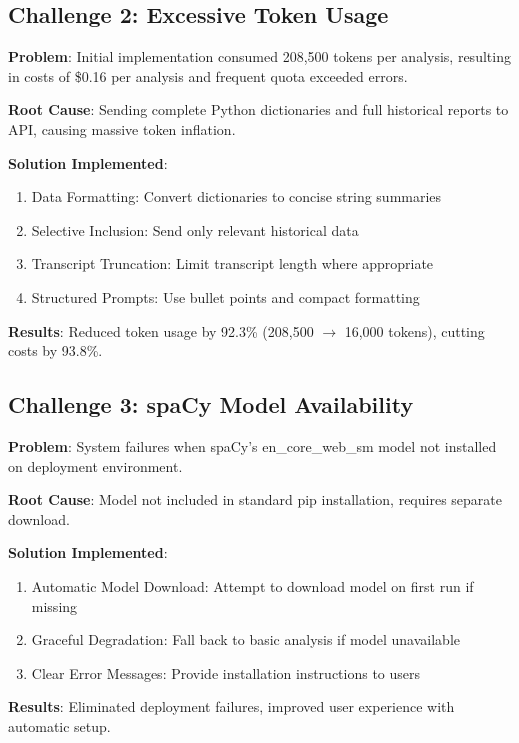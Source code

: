 \documentclass[conference]{IEEEtran}
\begin{document}
\subsection{Challenge 2: Excessive Token Usage}

\textbf{Problem}: Initial implementation consumed 208,500 tokens per analysis, resulting in costs of \$0.16 per analysis and frequent quota exceeded errors.

\textbf{Root Cause}: Sending complete Python dictionaries and full historical reports to API, causing massive token inflation.

\textbf{Solution Implemented}:
\begin{enumerate}
    \item Data Formatting: Convert dictionaries to concise string summaries
    \item Selective Inclusion: Send only relevant historical data
    \item Transcript Truncation: Limit transcript length where appropriate
    \item Structured Prompts: Use bullet points and compact formatting
\end{enumerate}

\textbf{Results}: Reduced token usage by 92.3\% (208,500 $\rightarrow$ 16,000 tokens), cutting costs by 93.8\%.

\subsection{Challenge 3: spaCy Model Availability}

\textbf{Problem}: System failures when spaCy's en\_core\_web\_sm model not installed on deployment environment.

\textbf{Root Cause}: Model not included in standard pip installation, requires separate download.

\textbf{Solution Implemented}:
\begin{enumerate}
    \item Automatic Model Download: Attempt to download model on first run if missing
    \item Graceful Degradation: Fall back to basic analysis if model unavailable
    \item Clear Error Messages: Provide installation instructions to users
\end{enumerate}

\textbf{Results}: Eliminated deployment failures, improved user experience with automatic setup.
\end{document}
